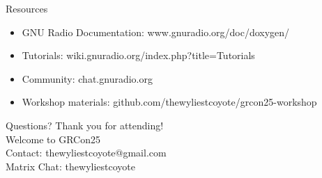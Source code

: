 \documentclass[aspectratio=169,11pt]{beamer}
\begin{document}
\begin{frame}{Resources}
\begin{itemize}
    \item GNU Radio Documentation: www.gnuradio.org/doc/doxygen/
    \item Tutorials: wiki.gnuradio.org/index.php?title=Tutorials
    \item Community: chat.gnuradio.org
    \item Workshop materials: github.com/thewyliestcoyote/grcon25-workshop
\end{itemize}
\end{frame}

\begin{frame}{Questions?}
\centering
\Large Thank you for attending!\\[1em]
\Large Welcome to GRCon25\\[1em]
\normalsize
Contact: thewyliestcoyote@gmail.com \\
Matrix Chat: thewyliestcoyote
\end{frame}
\end{document}
